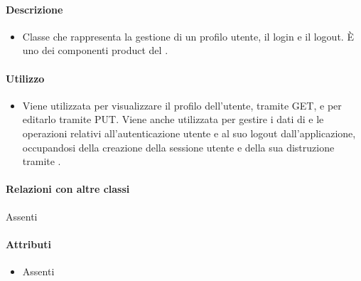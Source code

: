 \paragraph*{Descrizione}
\begin{itemize}
\item[] Classe che rappresenta la gestione di un profilo utente, il login e il logout. È uno dei componenti product del  .

\end{itemize}

\paragraph*{Utilizzo}
\begin{itemize}
\item[] Viene utilizzata per visualizzare il profilo dell'utente, tramite GET, e per editarlo tramite PUT. Viene anche utilizzata per gestire i dati di e le operazioni relativi all'autenticazione utente e al suo logout dall'applicazione, occupandosi della creazione della sessione utente e della sua distruzione tramite .
\end{itemize}

\paragraph*{Relazioni con altre classi}
Assenti

\paragraph*{Attributi}
\begin{itemize}
\item[] Assenti
\end{itemize}

